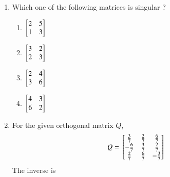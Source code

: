 \documentclass[journal]{IEEEtran}
\begin{document}
\begin{enumerate}
\begin{enumerate}
\end{enumerate}
\item Which one of the following matrices is singular ?
\begin{enumerate}
    \item ${}\left[\begin{matrix}
        2 & 5 \\ 1 & 3
    \end{matrix}\right]$
    \item ${}\left[\begin{matrix}
        3 & 2 \\ 2 & 3
    \end{matrix}\right]$
    \item ${}\left[\begin{matrix}
        2 & 4 \\ 3 & 6
    \end{matrix}\right]$
    \item ${}\left[\begin{matrix}
        4 & 3 \\ 6 & 2 \\
    \end{matrix}\right]$
\end{enumerate}
\item For the given orthogonal matrix $Q$,
\begin{align*}
    Q = {}\left[\begin{matrix}
        \frac{3}{7} & \frac{2}{7} & \frac{6}{7} \\
        -\frac{6}{7} & \frac{3}{7} & \frac{2}{7} \\
        \frac{2}{7} & \frac{6}{7} & -\frac{3}{7}
    \end{matrix}\right]
\end{align*}
The inverse is
\end{enumerate}
\end{document}
